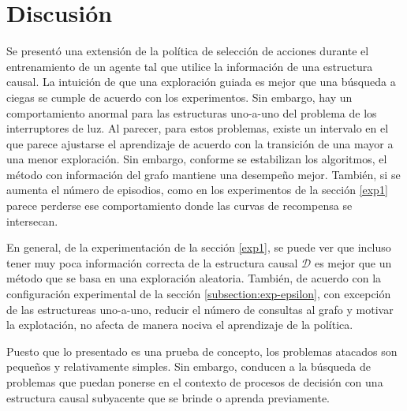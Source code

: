 \newpage
\section{Discusión}

Se presentó una extensión de la política de selección
de acciones durante el entrenamiento de un agente tal que utilice la información de una estructura causal. La intuición de que una exploración
guiada es mejor que una búsqueda a ciegas se cumple de acuerdo 
con los experimentos. Sin embargo, hay un comportamiento anormal
para las estructuras uno-a-uno del problema de los interruptores de luz.
Al parecer, para estos problemas, existe un intervalo en el que parece 
ajustarse el aprendizaje de acuerdo con la transición de una mayor a una menor exploración. Sin embargo, conforme se estabilizan los algoritmos, el método con información del grafo mantiene una desempeño mejor. También, si se aumenta el 
número de episodios, como en los experimentos de la sección \ref{exp1}
parece perderse ese comportamiento donde las curvas de recompensa se intersecan.

En general, de la experimentación de la sección \ref{exp1}, se puede ver que incluso tener muy poca información correcta de la estructura causal $\mathcal{D}$ es mejor que un método que se basa en una exploración aleatoria. También, de acuerdo con
la configuración experimental de la sección \ref{subsection:exp-epsilon}, con excepción de las estructureas uno-a-uno, reducir el número de consultas al grafo y motivar la explotación, no afecta de manera nociva el
aprendizaje de la política.

Puesto que lo presentado es una prueba de concepto, los problemas atacados
son pequeños y relativamente simples. Sin embargo, conducen a la búsqueda
de problemas que puedan ponerse en el contexto de procesos de decisión
con una estructura causal subyacente que se brinde o aprenda previamente.




